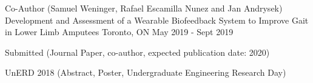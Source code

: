 \begin{cventries}
  \cventry
    {Co-Author (Samuel Weninger, Rafael Escamilla Nunez and Jan Andrysek)} %
    {Development and Assessment of a Wearable Biofeedback System to Improve Gait in Lower Limb Amputees} %
    {Toronto, ON} %
    {May 2019 - Sept 2019} %
    {
      \begin{cvitems} %
        \item {Submitted (Journal Paper, co-author, expected publication date: 2020)}
        \item {UnERD 2018 (Abstract, Poster, Undergraduate Engineering Research Day)}
      \end{cvitems}
    }

\end{cventries}
